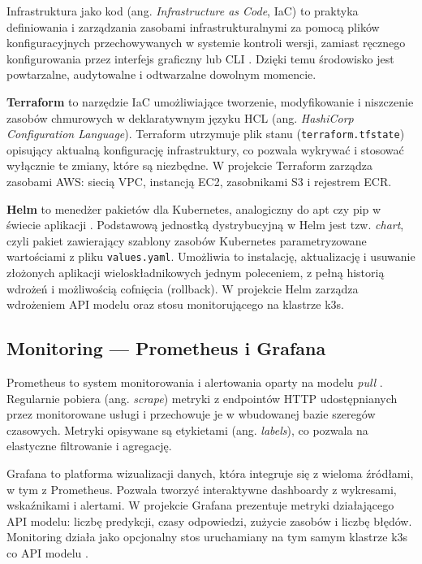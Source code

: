 Infrastruktura jako kod (ang. \textit{Infrastructure as Code}, IaC) to praktyka definiowania i zarządzania zasobami infrastrukturalnymi za pomocą plików konfiguracyjnych przechowywanych w systemie kontroli wersji, zamiast ręcznego konfigurowania przez interfejs graficzny lub CLI \cite{hashicorp_terraform}. Dzięki temu środowisko jest powtarzalne, audytowalne i odtwarzalne dowolnym momencie.

\textbf{Terraform} to narzędzie IaC umożliwiające tworzenie, modyfikowanie i niszczenie zasobów chmurowych w deklaratywnym języku HCL (ang. \textit{HashiCorp Configuration Language}). Terraform utrzymuje plik stanu (\texttt{terraform.tfstate}) opisujący aktualną konfigurację infrastruktury, co pozwala wykrywać i stosować wyłącznie te zmiany, które są niezbędne. W projekcie Terraform zarządza zasobami AWS: siecią VPC, instancją EC2, zasobnikami S3 i rejestrem ECR.

\textbf{Helm} to menedżer pakietów dla Kubernetes, analogiczny do apt czy pip w świecie aplikacji \cite{helm_docs}. Podstawową jednostką dystrybucyjną w Helm jest tzw. \textit{chart}, czyli pakiet zawierający szablony zasobów Kubernetes parametryzowane wartościami z pliku \texttt{values.yaml}. Umożliwia to instalację, aktualizację i usuwanie złożonych aplikacji wieloskładnikowych jednym poleceniem, z pełną historią wdrożeń i możliwością cofnięcia (rollback). W projekcie Helm zarządza wdrożeniem API modelu oraz stosu monitorującego na klastrze k3s.

\subsection{Monitoring --- Prometheus i Grafana}

Prometheus to system monitorowania i alertowania oparty na modelu \textit{pull} \cite{prometheus_docs}. Regularnie pobiera (ang. \textit{scrape}) metryki z endpointów HTTP udostępnianych przez monitorowane usługi i przechowuje je w wbudowanej bazie szeregów czasowych. Metryki opisywane są etykietami (ang. \textit{labels}), co pozwala na elastyczne filtrowanie i agregację.

Grafana to platforma wizualizacji danych, która integruje się z wieloma źródłami, w tym z Prometheus. Pozwala tworzyć interaktywne dashboardy z wykresami, wskaźnikami i alertami. W projekcie Grafana prezentuje metryki działającego API modelu: liczbę predykcji, czasy odpowiedzi, zużycie zasobów i liczbę błędów. Monitoring działa jako opcjonalny stos uruchamiany na tym samym klastrze k3s co API modelu \cite{grafana_intro}.
